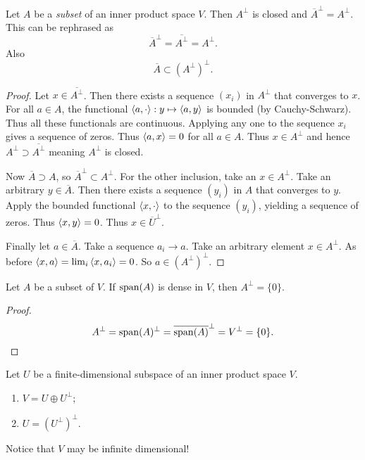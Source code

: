 \begin{proposition} \label{prop:orthogonalComplementClosed}
Let $A$ be a \emph{subset} of an inner product space $V$. Then $A^\perp$ is closed and $\overline{A}^\perp = A^\perp$. This can be rephrased as
\[ \overline{A}^\perp = \overline{A^\perp} = A^\perp. \]
Also
\[\overline{A} \subset (A^\perp)^\perp. \]
\end{proposition}
\begin{proof}
Let $x\in \overline{A^\perp}$. Then there exists a sequence $(x_i)$ in $A^\perp$ that converges to $x$. For all $a\in A$, the functional $\left\langle a,\cdot \right\rangle:y\mapsto \left\langle a,y \right\rangle$ is bounded (by Cauchy-Schwarz). Thus all these functionals are continuous. Applying any one to the sequence $x_i$ gives a sequence of zeros. Thus $\left\langle a,x \right\rangle = 0$ for all $a\in A$. Thus $x\in A^\perp$ and hence $A^\perp \supset \overline{A^\perp}$ meaning $A^\perp$ is closed.

Now $\overline{A}\supset A$, so $\overline{A}^\perp \subset A^\perp$. For the other inclusion, take an $x\in A^\perp$. Take an arbitrary $y\in \overline{A}$. Then there exists a sequence $(y_i)$ in $A$ that converges to $y$. Apply the bounded functional $\left\langle x,\cdot \right\rangle$ to the sequence $(y_i)$, yielding a sequence of zeros. Thus $\left\langle x,y \right\rangle=0$. Thus $x\in \overline{U}^\perp$.

Finally let $a\in \overline{A}$. Take a sequence $a_i\to a$. Take an arbitrary element $x\in A^\perp$. As before $\left\langle x,a \right\rangle = \lim_i\left\langle x,a_i \right\rangle = 0$. So $a\in (A^\perp)^\perp$.
\end{proof}
\begin{corollary} \label{corollary:orthogonalComplementClosed}
Let $A$ be a subset of $V$. If $\operatorname{span}(A)$ is dense in $V$, then $A^\perp = \{0\}$. 
\end{corollary}
\begin{proof}
\[ A^\perp = \operatorname{span}(A)^\perp = \overline{\operatorname{span}(A)}^\perp = V^\perp = \{0\}. \]
\end{proof}
\begin{proposition}
Let $U$ be a finite-dimensional subspace of an inner product space $V$.
\begin{enumerate}
\item $V=U\oplus U^\perp$;
\item $U = (U^\perp)^\perp$.
\end{enumerate}
\end{proposition}
Notice that $V$ may be infinite dimensional!
